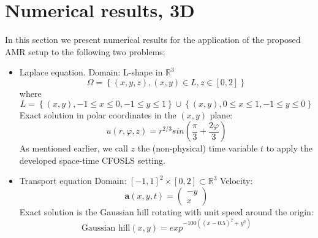 \documentclass[a4paper,12pt]{amsart}
\numberwithin{equation}{section}
\def\bu{{\mathbf a}} %
\begin{document}
%
%

\section{Numerical results, 3D}

In this section we present numerical results for the application of the proposed AMR setup to the following two problems:

\begin{itemize}
	\item Laplace equation. \newline
	Domain: L-shape in $\mathbb{R}^3$
	$$
	\Omega = \left\{ (x,y,z), (x,y) \in L, z\in [0,2] \right\}
	$$
	where
	$$
	L = \left\{ (x,y), -1 \leq x \leq 0, -1 \leq y \leq 1 \right\} \cup
	\left\{ (x,y), 0 \leq x \leq 1, -1 \leq y \leq 0 \right\}
	$$
	Exact solution in polar coordinates in the $(x,y)$ plane:
	$$
	u(r,\varphi,z) = r^{2/3} sin ( \frac{\pi}{3} + \frac{2\varphi}{3} )
	$$
	As mentioned earlier, we call $z$ the (non-physical) time variable $t$ to apply the developed space-time CFOSLS setting.
	\item Transport equation \newline
	Domain: $[-1,1]^2 \times [0,2] \subset \mathbb{R}^3$ \newline
	Velocity: 
	$$
	\bu(x,y,t) = 
	\left(
	\begin{array}{c}
	-y \\
    x
	\end{array}
	\right)
	$$
	Exact solution is the Gaussian hill rotating with unit speed around the origin:
	$$
	\mbox{Gaussian hill}(x,y) = exp^{-100 \left( (x-0.5)^2 + y^2 \right) }
	$$
\end{itemize}
\end{document}
